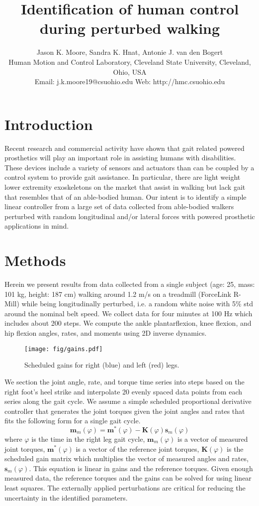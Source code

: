 \documentclass[10pt,letterpaper,notitlepage,twocolumn]{article}
\title{\bf Identification of human control during perturbed walking}
\author{
  Jason K. Moore, Sandra K. Hnat, Antonie J. van den Bogert\\
  Human Motion and Control Laboratory, Cleveland State University, Cleveland, Ohio, USA\\
  Email: j.k.moore19@csuohio.edu Web: http://hmc.csuohio.edu
}
\date{}
\begin{document}

\maketitle

\section*{Introduction}
%
Recent research and commercial activity have shown that gait related powered
prosthetics will play an important role in assisting humans with disabilities.
These devices include a variety of sensors and actuators than can be coupled by
a control system to provide gait assistance. In particular, there are light
weight lower extremity exoskeletons on the market that assist in walking but
lack gait that resembles that of an able-bodied human. Our intent is to
identify a simple linear controller from a large set of data collected from
able-bodied walkers perturbed with random longitudinal and/or lateral forces
with powered prosthetic applications in mind.
%
\section*{Methods}
Herein we present results from data collected from a single subject (age: 25,
mass: 101 kg, height: 187 cm) walking around 1.2 m/s on a treadmill (ForceLink
R-Mill) while being longitudinally perturbed, i.e. a random white noise with
5\% std around the nominal belt speed. We collect data for four minutes at 100
Hz which includes about 200 steps. We compute the ankle plantarflexion, knee
flexion, and hip flexion angles, rates, and moments using 2D inverse dynamics.
%
\begin{figure}[hbt]
  \begin{center}
    \texttt{[image: fig/gains.pdf]}
    \caption{Scheduled gains for right (blue) and left (red) legs.}
    \label{fig:gains}
  \end{center}
\end{figure}

We section the joint angle, rate, and torque time series into steps based on
the right foot's heel strike and interpolate 20 evenly spaced data points from
each series along the gait cycle. We assume a simple scheduled proportional
derivative controller that generates the joint torques given the joint angles
and rates that fits the following form for a single gait cycle.
%
\begin{equation}
  \mathbf{m}_m(\varphi) = \mathbf{m}^*(\varphi) -
  \mathbf{K}(\varphi)\mathbf{s}_m(\varphi)
\end{equation}
%
where $\varphi$ is the time in the right leg gait cycle,
$\mathbf{m}_m(\varphi)$ is a vector of measured joint torques,
$\mathbf{m}^*(\varphi)$ is a vector of the reference joint torques,
$\mathbf{K}(\varphi)$ is the scheduled gain matrix which multiplies the vector
of measured angles and rates, $\mathbf{s}_m(\varphi)$. This equation is linear
in gains and the reference torques. Given enough measured data, the reference
torques and the gains can be solved for using linear least squares. The
externally applied perturbations are critical for reducing the uncertainty in
the identified parameters.
\end{document}
